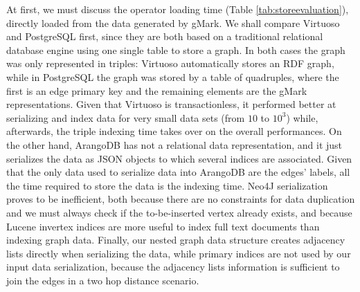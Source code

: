 At first, we must discuss the operator loading time (Table \ref{tab:storeevaluation}), directly loaded from the data generated by gMark. We shall  compare Virtuoso and PostgreSQL first, since they are both based on a traditional relational database engine using one single table to store a graph. In both cases the graph was only represented in triples: Virtuoso automatically stores an RDF graph, while in PostgreSQL the graph was stored by a table of quadruples, where the first is an edge primary key and the remaining elements are the gMark representations. Given that Virtuoso is transactionless, it performed better at serializing and index data for very small data sets (from $10$ to $10^3$) while, afterwards, the triple indexing time takes over on the overall performances. On the other hand, ArangoDB has not a relational data representation, and it just serializes the data as JSON objects to which several indices are associated. Given that the only data used to serialize data into ArangoDB are the edges' labels, all the time required to store the data is the indexing time. Neo4J serialization proves to be inefficient, both because there are no constraints for data duplication and we must always check if the to-be-inserted vertex already exists, and because Lucene invertex indices are more useful to index full text documents than indexing graph data. Finally, our nested graph data structure creates adjacency lists directly when serializing the data, while primary indices are not used by our input data serialization, because the adjacency lists information is sufficient to join the edges in a two hop distance scenario.

